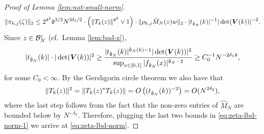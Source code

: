 \documentclass{amsart}
\numberwithin{equation}{section}
\def\corAB{}
\begin{document}
\begin{proof}[Proof of Lemma \ref{lem:not-small-norm}]
\begin{equation}
\|\pi_{k,j}(\zeta)\|_2 \le   2^{\mathfrak{d}^2} {\mathfrak{d}^{3/2}} N^{3\delta_3/2}   \cdot \left(\|T_k(z)\|^{\mathfrak{d}^2}\vee 1\right)\cdot \|\rho_{k,j} \hat{M}_N(z) w\|_2 \cdot | t_{\hat{\mathfrak{d}}_N}(k)|^{-1} |\det({\bm V}(k))|^{-2}.
\end{equation}
Since $z\in \mathcal{B}_N^c$ (cf.\ Lemma \ref{lem:bad-z}),
\[
|t_{\hat{\mathfrak{d}}_N}(k)| \cdot  |\det({\bm V}(k))|^2 \ge \frac{|t_{\hat{\mathfrak{d}}_N}(k)|^{\hat{\mathfrak{d}}_N(k)-1} |\det({\bm V}(k))|^2}{\sup_{x \in [0,1]} |f_{\hat{\mathfrak{d}}_N}(x)|^{\hat{\mathfrak{d}}_N-2}}  \ge C_0^{-1} N^{-2\delta_1 \mathfrak{d}},
\]
for some $C_0 <\infty$. By the Gershgorin circle theorem we also have that
\begin{equation}
\label{eq:Tkz}
\|T_k(z)\|^2
=
\|T_k(z)^*T_k(z)\|
= O\left((t_{\hat{\mathfrak{d}}_N}(k))^{-2}\right)=O(N^{2\delta_2}),
\end{equation}
where the last step follows from the fact that the non-zero entries of $\hat{M}_N$ are bounded below by $N^{-\delta_2}$. Therefore, plugging the last two bounds in \eqref{eq:zeta-lbd-norm-1} we arrive at \eqref{eq:zeta-lbd-norm}.
\end{proof}
\end{document}
